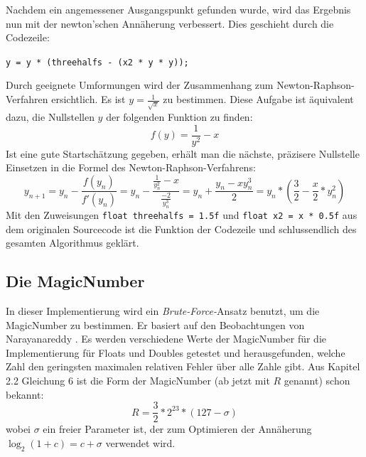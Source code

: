 \documentclass[course=erap]{aspdoc}
\begin{document}
Nachdem ein angemessener Ausgangspunkt gefunden wurde, wird das Ergebnis nun mit der newton'schen Annäherung verbessert. Dies geschieht durch die Codezeile:
\begin{center}
    \lstinline{y = y * (threehalfs - (x2 * y * y));}
\end{center}
Durch geeignete Umformungen wird der Zusammenhang zum Newton-Raphson-Verfahren ersichtlich. Es ist $y = \frac{1}{\sqrt{x}}$ zu bestimmen. Diese Aufgabe ist äquivalent dazu, die Nullstellen $y$ der folgenden Funktion zu finden:
\begin{equation*}
    f(y) = \frac{1}{y^2} - x
\end{equation*}
Ist eine gute Startschätzung gegeben, erhält man die nächste, präzisere Nullstelle Einsetzen in die Formel des Newton-Raphson-Verfahrens:
\begin{equation}
    y_{n+1} = y_n - \frac{f(y_n)}{f'(y_n)} 
    = y_n - \frac{\frac{1}{y_n^2} - x}{\frac{-2}{y_n^3}} 
    = y_n + \frac{y_n - xy_n^3}{2}
    = y_n * \left(\frac{3}{2} - \frac{x}{2}*y_n^2\right)
\end{equation}
Mit den Zuweisungen \lstinline{float threehalfs = 1.5f} und \lstinline{float x2 = x * 0.5f} aus dem originalen Sourcecode ist die Funktion der Codezeile und schlussendlich des gesamten Algorithmus geklärt.

\subsection{Die MagicNumber}
In dieser Implementierung wird ein \emph{Brute-Force-}Ansatz benutzt, um die MagicNumber zu bestimmen. Er basiert auf den Beobachtungen von Narayanareddy \cite{preetham}. Es werden verschiedene Werte der MagicNumber für die Implementierung für Floats und Doubles getestet und herausgefunden, welche Zahl den geringsten maximalen relativen Fehler über alle Zahle gibt. Aus Kapitel 2.2 Gleichung 6 ist die Form der MagicNumber (ab jetzt mit $R$ genannt) schon bekannt:
\begin{equation}
    R = \frac{3}{2} * 2^{23} * (127 - \sigma)
\end{equation}
wobei $\sigma$ ein freier Parameter ist, der zum Optimieren der Annäherung $\log_2(1 + c) = c + \sigma$ verwendet wird.\par
\end{document}
